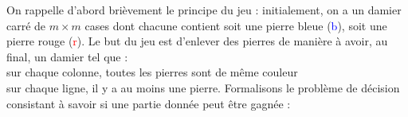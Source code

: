 			On rappelle d'abord brièvement le principe du jeu : initialement, on a un damier carré de \(m\times m\) cases dont chacune contient soit une pierre bleue (\textcolor{blue}{b}), soit une pierre rouge (\textcolor{red}{r}). \nt
			Le but du jeu est d'enlever des pierres de manière à avoir, au final, un damier tel que : \\
				 \bdot sur chaque colonne, toutes les pierres sont de même couleur \\
				 \bdot sur chaque ligne, il y a au moins une pierre. \nll
			Formalisons le problème de décision consistant à savoir si une partie donnée peut être gagnée :
			
			\begin{center}
			\end{center} \eqskip{2mm}
		
